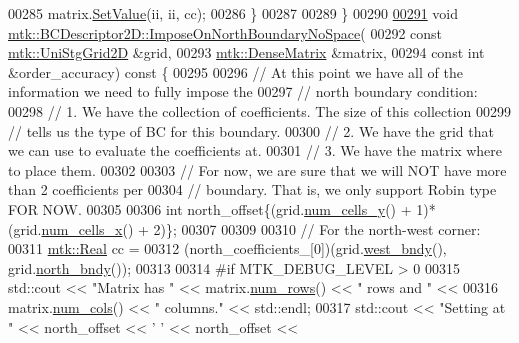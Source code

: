 \begin{DoxyCode}
00285     matrix.\hyperlink{classmtk_1_1DenseMatrix_a784ce5784109ac86bfb9d8562b334b13}{SetValue}(ii, ii, cc);
00286   \}
00287 
00289 \}
00290 
\hypertarget{mtk__bc__descriptor__2d_8cc_source_l00291}{}\hyperlink{classmtk_1_1BCDescriptor2D_a5e7d4b9deba6c07170e983eb1c0e9776}{00291} \textcolor{keywordtype}{void} \hyperlink{classmtk_1_1BCDescriptor2D_a5e7d4b9deba6c07170e983eb1c0e9776}{mtk::BCDescriptor2D::ImposeOnNorthBoundaryNoSpace}(
00292     \textcolor{keyword}{const} \hyperlink{classmtk_1_1UniStgGrid2D}{mtk::UniStgGrid2D} &grid,
00293     \hyperlink{classmtk_1_1DenseMatrix}{mtk::DenseMatrix} &matrix,
00294     \textcolor{keyword}{const} \textcolor{keywordtype}{int} &order\_accuracy)\textcolor{keyword}{ const }\{
00295 
00296   \textcolor{comment}{// At this point we have all of the information we need to fully impose the}
00297   \textcolor{comment}{// north boundary condition:}
00298   \textcolor{comment}{// 1. We have the collection of coefficients. The size of this collection}
00299   \textcolor{comment}{// tells us the type of BC for this boundary.}
00300   \textcolor{comment}{// 2. We have the grid that we can use to evaluate the coefficients at.}
00301   \textcolor{comment}{// 3. We have the matrix where to place them.}
00302 
00303   \textcolor{comment}{// For now, we are sure that we will NOT have more than 2 coefficients per}
00304   \textcolor{comment}{// boundary. That is, we only support Robin type FOR NOW.}
00305 
00306   \textcolor{keywordtype}{int} north\_offset\{(grid.\hyperlink{classmtk_1_1UniStgGrid2D_aed05a801cc9a76dba0ff203cea58a61a}{num\_cells\_y}() + 1)*(grid.\hyperlink{classmtk_1_1UniStgGrid2D_a2d182866a398aba8e4829590e85bf939}{num\_cells\_x}() + 2)\};
00307 
00309 
00310   \textcolor{comment}{// For the north-west corner:}
00311   \hyperlink{group__c01-roots_gac080bbbf5cbb5502c9f00405f894857d}{mtk::Real} cc =
00312     (north\_coefficients\_[0])(grid.\hyperlink{classmtk_1_1UniStgGrid2D_af2b1712387ded85edaf2b64617d3fc13}{west\_bndy}(), grid.\hyperlink{classmtk_1_1UniStgGrid2D_afe1ead253cdeb5503e0489eba8fd84e2}{north\_bndy}());
00313 
00314 \textcolor{preprocessor}{  #if MTK\_DEBUG\_LEVEL > 0}
00315   std::cout << \textcolor{stringliteral}{"Matrix has "} << matrix.\hyperlink{classmtk_1_1DenseMatrix_a53f3afb3b6a8d21854458aaa9663cc74}{num\_rows}() << \textcolor{stringliteral}{" rows and "} <<
00316     matrix.\hyperlink{classmtk_1_1DenseMatrix_a41747502d468c6728a4be31501b16e0e}{num\_cols}() << \textcolor{stringliteral}{" columns."} << std::endl;
00317   std::cout << \textcolor{stringliteral}{"Setting at "} << north\_offset << \textcolor{charliteral}{' '} << north\_offset <<

\end{DoxyCode}
